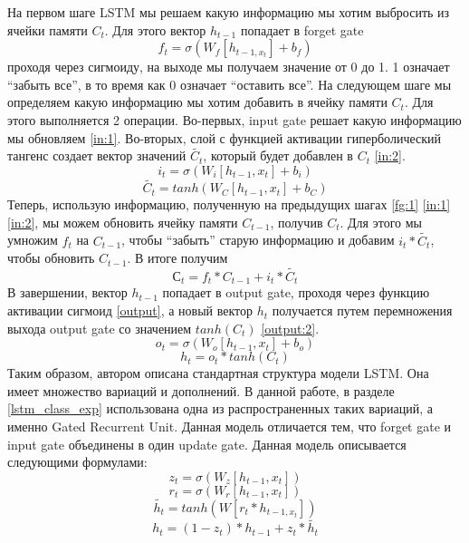     На первом шаге LSTM мы решаем какую информацию мы хотим выбросить из ячейки памяти $C_{t}$. Для этого вектор $h_{t-1}$ попадает в forget gate
    \begin{equation}\label{fg:1}
    f_{t} = \sigma(W_{f}[h_{t-1,x_{t}}]+b_{f})
    \end{equation}
    проходя через сигмоиду, на выходе мы получаем значение от 0 до 1. 1 означает ``забыть все'', в то время как 0 означает ``оставить все''.
    На следующем шаге мы определяем какую информацию мы хотим добавить в ячейку памяти $C_{t}$. Для этого выполняется 2 операции. Во-первых, input gate решает какую информацию мы обновляем \ref{in:1}. Во-вторых, слой с функцией активации гиперболический тангенс создает вектор значений $\tilde{C_{t}}$, который будет добавлен в $C_{t}$ \ref{in:2}.
    \begin{equation}\label{in:1}
    i_{t}=\sigma(W_{i}[h_{t-1},x_{t}]+b_{i})
    \end{equation}
    \begin{equation}\label{in:2}
    \tilde{C_{t}} = tanh(W_{C}[h_{t-1},x_{t}]+b_{C})
    \end{equation}
    Теперь, использую информацию, полученную на предыдущих шагах \ref{fg:1} \ref{in:1} \ref{in:2}, мы можем обновить ячейку памяти $C_{t-1}$, получив $C_{t}$. Для этого мы умножим $f_{t}$ на $C_{t-1}$, чтобы ``забыть'' старую информацию и добавим $i_{t}*\tilde{C_{t}}$, чтобы обновить $C_{t-1}$. В итоге получим
    \begin{equation}\label{update}
    С_{t}=f_{t}*C_{t-1}+i_{t}*\tilde{C_{t}}
    \end{equation}
    В завершении, вектор $h_{t-1}$ попадает в output gate, проходя через функцию активации сигмоид \ref{output}, а новый вектор $h_{t}$ получается путем перемножения выхода output gate со значением $tanh(C_{t})$ \ref{output:2}.
    \begin{equation}\label{output}
    o_{t}=\sigma(W_{o}[h_{t-1},x_{t}]+b_{o})
    \end{equation}
    \begin{equation}\label{output:2}
    h_{t}=o_{t}*tanh(C_{t})
    \end{equation}
    Таким образом, автором описана стандартная структура модели LSTM. Она имеет множество вариаций и дополнений. В данной работе, в разделе \ref{lstm_class_exp} использована одна из распространенных таких вариаций, а именно Gated Recurrent Unit. Данная модель отличается тем, что forget gate и input gate объединены в один update gate. Данная модель описывается следующими формулами:
    \begin{equation}\label{gr:1}
    z_{t}=\sigma(W_{z}[h_{t-1},x_{t}])
    \end{equation}
    \begin{equation}\label{gr:2}
    r_{t}=\sigma(W_{r}[h_{t-1},x_{t}])
    \end{equation}
    \begin{equation}\label{gr:3}
    \tilde{h_{t}}=tanh(W[r_{t}*h_{t-1,x_{t}}])
    \end{equation}
    \begin{equation}\label{gr:4}
    h_{t}=(1-z_{t})*h_{t-1}+z_{t}*\tilde{h_{t}}
    \end{equation}
\clearpage

